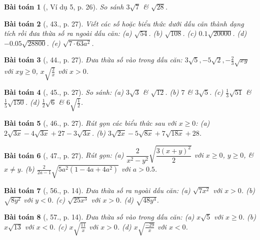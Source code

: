 \documentclass{article}
\newtheorem{baitoan}{Bài toán}
\begin{document}
\begin{baitoan}[\cite{SGK_Toan_9_tap_1}, Ví dụ 5, p. 26]
	So sánh $3\sqrt{7}$ \& $\sqrt{28}$.
\end{baitoan}

\begin{baitoan}[\cite{SGK_Toan_9_tap_1}, 43., p. 27]
	Viết các số hoặc biểu thức dưới dấu căn thành dạng tích rồi đưa thừa số ra ngoài dấu căn: (a) $\sqrt{54}$. (b) $\sqrt{108}$. (c) $0.1\sqrt{20000}$. (d) $-0.05\sqrt{28800}$. (e) $\sqrt{7\cdot63a^2}$.
\end{baitoan}

\begin{baitoan}[\cite{SGK_Toan_9_tap_1}, 44., p. 27]
	Đưa thừa số vào trong dấu căn: $3\sqrt{5},-5\sqrt{2},-\frac{2}{3}\sqrt{xy}$ với $xy\ge0$, $x\sqrt{\frac{2}{x}}$ với $x > 0$.
\end{baitoan}

\begin{baitoan}[\cite{SGK_Toan_9_tap_1}, 45., p. 27]
	So sánh: (a) $3\sqrt{3}$ \& $\sqrt{12}$. (b) $7$ \& $3\sqrt{5}$. (c) $\frac{1}{3}\sqrt{51}$ \& $\frac{1}{5}\sqrt{150}$. (d) $\frac{1}{2}\sqrt{6}$ \& $6\sqrt{\frac{1}{2}}$.	
\end{baitoan}

\begin{baitoan}[\cite{SGK_Toan_9_tap_1}, 46., p. 27]
	Rút gọn các biểu thức sau với $x\ge0$: (a) $2\sqrt{3x} - 4\sqrt{3x} + 27 - 3\sqrt{3x}$. (b) $3\sqrt{2x} - 5\sqrt{8x} + 7\sqrt{18x} + 28$.
\end{baitoan}

\begin{baitoan}[\cite{SGK_Toan_9_tap_1}, 47., p. 27]
	Rút gọn: (a) $\dfrac{2}{x^2 - y^2}\sqrt{\dfrac{3(x + y)^2}{2}}$ với $x\ge0$, $y\ge0$, \& $x\ne y$. (b) $\frac{2}{2a - 1}\sqrt{5a^2(1 - 4a + 4a^2)}$ với $a > 0.5$.
\end{baitoan}

\begin{baitoan}[\cite{SBT_Toan_9_tap_1}, 56., p. 14]
	Đưa thừa số ra ngoài dấu căn: (a) $\sqrt{7x^2}$ với $x > 0$. (b) $\sqrt{8y^2}$ với $y < 0$. (c) $\sqrt{25x^3}$ với $x > 0$. (d) $\sqrt{48y^4}$.
\end{baitoan}

\begin{baitoan}[\cite{SBT_Toan_9_tap_1}, 57., p. 14]
	Đưa thừa số vào trong dấu căn: (a) $x\sqrt{5}$ với $x\ge0$. (b) $x\sqrt{13}$ với $x < 0$. (c) $x\sqrt{\frac{11}{x}}$ với $x > 0$. (d) $x\sqrt{\frac{-29}{x}}$  với $x < 0$.
\end{baitoan}
\end{document}
